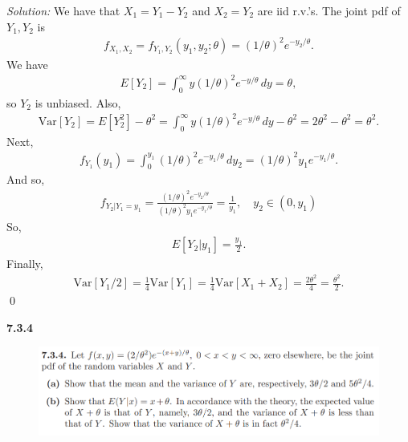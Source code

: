 \documentclass{book}
\theoremstyle{definition}
\newcommand{\Var}{\text{Var}}
\newcommand{\f}[2]{\frac{#1}{#2}}
\begin{document}
\noindent \textit{Solution:} We have that $X_1 = Y_1 - Y_2$ and $X_2 = Y_2$ are iid r.v.'s. The joint pdf of $Y_1, Y_2$ is 
\begin{align}
f_{X_1,X_2} = f_{Y_1,Y_2}(y_1,y_2;\theta) = (1/\theta)^2e^{-y_2/\theta}. 
\end{align} 
We have 
\begin{align}
E[Y_2] = \int^\infty_0 y(1/\theta)^2e^{-y/\theta}\,dy = \theta,
\end{align}
so $Y_2$ is unbiased. Also,
\begin{align*}
\Var[Y_2] = E[Y_2^2] - \theta^2 = \int^\infty_0 y(1/\theta)^2e^{-y/\theta}\,dy - \theta^2 = 2\theta^2-\theta^2 = \theta^2.
\end{align*}
Next,
\begin{align}
f_{Y_1}(y_1) = \int_0^{y_1}(1/\theta)^2e^{-y_1/\theta} \,dy_2 = (1/\theta)^2y_1 e^{-y_1/\theta}. 
\end{align}
And so,
\begin{align}
f_{Y_2\vert Y_1 = y_1} = \f{(1/\theta)^2e^{-y_2/\theta}}{(1/\theta)^2y_1 e^{-y_1/\theta}} = \f{1}{y_1}, \quad y_2 \in (0,y_1)
\end{align}
So,
\begin{align*}
E[Y_2\vert y_1] = \f{y_1}{2}.
\end{align*}
Finally,
\begin{align*}
\Var[Y_1/2] = \f{1}{4}\Var[Y_1] = \f{1}{4}\Var[X_1+X_2] = \f{2\theta^2}{4} = \f{\theta^2}{2}.
\end{align*}
\qed



\newpage





\noindent\textbf{7.3.4}
\begin{figure}[!htb]
	\centering
	\includegraphics[scale=1]{734}
\end{figure}
\end{document}
